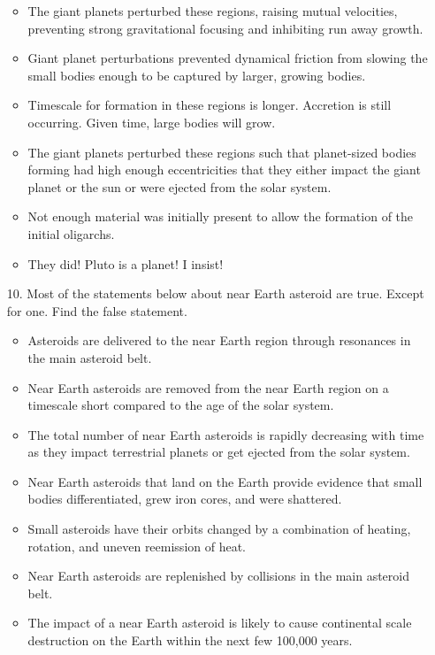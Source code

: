 \begin{enumerate}
    \begin{itemize}[label={$\bullet$}]
        \item The giant planets perturbed these regions, raising mutual velocities, preventing strong gravitational focusing and inhibiting run away growth.
        \item Giant planet perturbations prevented dynamical friction from slowing the small bodies enough to be captured by larger, growing bodies.
        \item Timescale for formation in these regions is longer. Accretion is still occurring. Given time, large bodies will grow.
        \item The giant planets perturbed these regions such that planet-sized bodies forming had high enough eccentricities that they either impact the giant planet or the sun or were ejected from the solar system.
        \item Not enough material was initially present to allow the formation of the initial oligarchs.
        \item They did! Pluto is a planet! I insist!
    \end{itemize}
    
    \item[10.] Most of the statements below about near Earth asteroid are true. Except for one. Find the false statement.
    
    \begin{itemize}[label={$\bullet$}]
        \item Asteroids are delivered to the near Earth region through resonances in the main asteroid belt.
        \item Near Earth asteroids are removed from the near Earth region on a timescale short compared to the age of the solar system.
        \item The total number of near Earth asteroids is rapidly decreasing with time as they impact terrestrial planets or get ejected from the solar system.
        \item Near Earth asteroids that land on the Earth provide evidence that small bodies differentiated, grew iron cores, and were shattered.
        \item Small asteroids have their orbits changed by a combination of heating, rotation, and uneven reemission of heat.
        \item Near Earth asteroids are replenished by collisions in the main asteroid belt.
        \item The impact of a near Earth asteroid is likely to cause continental scale destruction on the Earth within the next few 100,000 years.
    \end{itemize} 
    

\end{enumerate}
